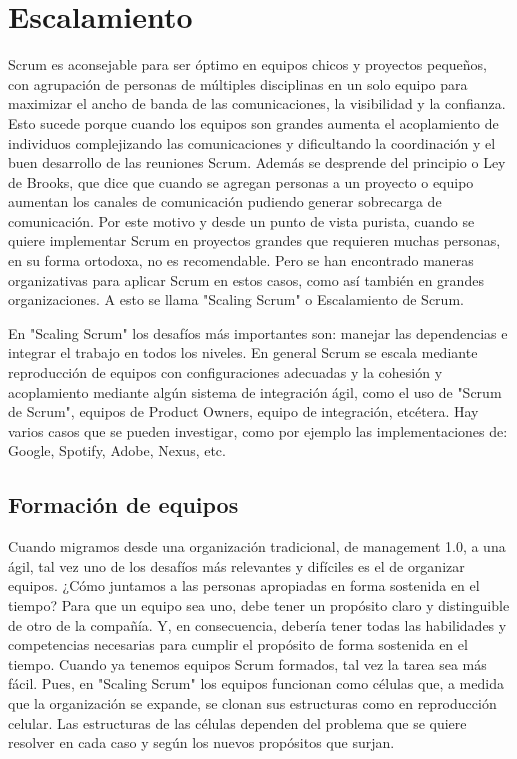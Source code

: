 \chapter{Escalamiento}

Scrum es aconsejable para ser óptimo en equipos chicos y proyectos pequeños, con agrupación de personas de múltiples disciplinas en un solo equipo para maximizar el ancho de banda de las comunicaciones, la visibilidad y la confianza. Esto sucede porque cuando los equipos son grandes aumenta el acoplamiento de individuos complejizando las comunicaciones y dificultando la coordinación y el buen desarrollo de las reuniones Scrum. Además se desprende del principio o Ley de Brooks, que dice que cuando se agregan personas a un proyecto o equipo aumentan los canales de comunicación pudiendo generar sobrecarga de comunicación. Por este motivo y desde un punto de vista purista, cuando se quiere implementar Scrum en proyectos grandes que requieren muchas personas, en su forma ortodoxa, no es recomendable. Pero se han encontrado maneras organizativas para aplicar Scrum en estos casos, como así también en grandes organizaciones. A esto se llama "Scaling Scrum" o Escalamiento de Scrum.

En "Scaling Scrum" los desafíos más importantes son: manejar las dependencias e integrar el trabajo en todos los niveles. En general Scrum se escala mediante reproducción de equipos con configuraciones adecuadas y la cohesión y acoplamiento mediante algún sistema de integración ágil, como el uso de "Scrum de Scrum", equipos de Product Owners, equipo de integración, etcétera. Hay varios casos que se pueden investigar, como por ejemplo las implementaciones de: Google, Spotify, Adobe, Nexus, etc.

\section{Formación de equipos}

Cuando migramos desde una organización tradicional, de management 1.0, a una ágil, tal vez uno de los desafíos más relevantes y difíciles es el de organizar equipos. ¿Cómo juntamos a las personas apropiadas en forma sostenida en el tiempo? Para que un equipo sea uno, debe tener un propósito claro y distinguible de otro de la compañía. Y, en consecuencia, debería tener todas las habilidades y competencias necesarias para cumplir el propósito de forma sostenida en el tiempo. Cuando ya tenemos equipos Scrum formados, tal vez la tarea sea más fácil. Pues, en "Scaling Scrum" los equipos funcionan como células que, a medida que la organización se expande, se clonan sus estructuras como en reproducción celular. Las estructuras de las células dependen del problema que se quiere resolver en cada caso y según los nuevos propósitos que surjan. 

